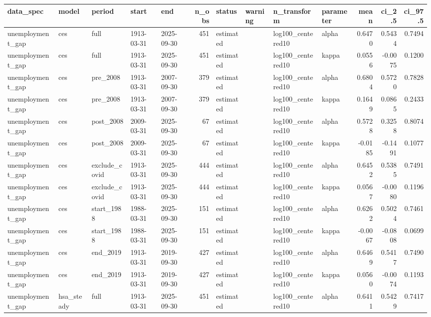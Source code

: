 \begin{tabular}{lllllrllllrrr}
\toprule
data\_spec & model & period & start & end & n\_obs & status & warning & n\_transform & parameter & mean & ci\_2.5 & ci\_97.5 \\
\midrule
unemployment\_gap & ces & full & 1913-03-31 & 2025-09-30 & 451 & estimated &  & log100\_centered10 & alpha & 0.6470 & 0.5434 & 0.7494 \\
unemployment\_gap & ces & full & 1913-03-31 & 2025-09-30 & 451 & estimated &  & log100\_centered10 & kappa & 0.0556 & -0.0075 & 0.1200 \\
unemployment\_gap & ces & pre\_2008 & 1913-03-31 & 2007-09-30 & 379 & estimated &  & log100\_centered10 & alpha & 0.6804 & 0.5720 & 0.7828 \\
unemployment\_gap & ces & pre\_2008 & 1913-03-31 & 2007-09-30 & 379 & estimated &  & log100\_centered10 & kappa & 0.1649 & 0.0865 & 0.2433 \\
unemployment\_gap & ces & post\_2008 & 2009-03-31 & 2025-09-30 & 67 & estimated &  & log100\_centered10 & alpha & 0.5728 & 0.3258 & 0.8074 \\
unemployment\_gap & ces & post\_2008 & 2009-03-31 & 2025-09-30 & 67 & estimated &  & log100\_centered10 & kappa & -0.0185 & -0.1491 & 0.1077 \\
unemployment\_gap & ces & exclude\_covid & 1913-03-31 & 2025-09-30 & 444 & estimated &  & log100\_centered10 & alpha & 0.6452 & 0.5385 & 0.7491 \\
unemployment\_gap & ces & exclude\_covid & 1913-03-31 & 2025-09-30 & 444 & estimated &  & log100\_centered10 & kappa & 0.0567 & -0.0080 & 0.1196 \\
unemployment\_gap & ces & start\_1988 & 1988-03-31 & 2025-09-30 & 151 & estimated &  & log100\_centered10 & alpha & 0.6262 & 0.5024 & 0.7461 \\
unemployment\_gap & ces & start\_1988 & 1988-03-31 & 2025-09-30 & 151 & estimated &  & log100\_centered10 & kappa & -0.0067 & -0.0808 & 0.0699 \\
unemployment\_gap & ces & end\_2019 & 1913-03-31 & 2019-09-30 & 427 & estimated &  & log100\_centered10 & alpha & 0.6469 & 0.5417 & 0.7490 \\
unemployment\_gap & ces & end\_2019 & 1913-03-31 & 2019-09-30 & 427 & estimated &  & log100\_centered10 & kappa & 0.0560 & -0.0074 & 0.1193 \\
unemployment\_gap & hsa\_steady & full & 1913-03-31 & 2025-09-30 & 451 & estimated &  & log100\_centered10 & alpha & 0.6411 & 0.5429 & 0.7417 \\

\end{tabular}

